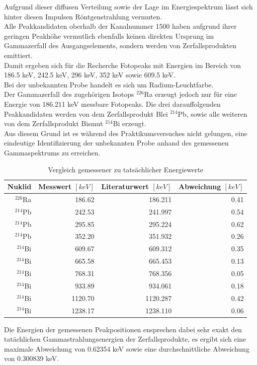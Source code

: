 \documentclass[12pt,german]{article}
\begin{document}
    Aufgrund dieser diffusen Verteilung sowie der Lage im Energiespektrum lässt sich hinter diesen Impulsen Röntgenstrahlung vermuten. \\
    Alle Peakkandidaten oberhalb der Kanalnummer 1500 haben aufgrund ihrer geringen Peakhöhe vermutlich ebenfalls keinen direkten Ursprung im Gammazerfall des Ausgangselements, sondern werden von Zerfallsprodukten emittiert. \\
    Damit ergeben sich für die Recherche Fotopeaks mit Energien im Bereich von 186.5 keV, 242.5 keV, 296 keV, 352 keV sowie 609.5 keV. \\
    Bei der unbekannten Probe handelt es sich um Radium-Leuchtfarbe. \\
    Der Gammazerfall des zugehörigen Isotops \(^{226}\)Ra erzeugt jedoch nur für eine Energie von 186.211 keV messbare Fotopeaks. Die drei darauffolgenden Peakkandidaten werden von dem Zerfallsprodukt Blei \(^{214}\)Pb, sowie alle weiteren von dem Zerfallsprodukt Bismut \(^{214}\)Bi erzeugt. \\
    Aus diesem Grund ist es während des Praktikumsversuches nicht gelungen, eine eindeutige Identifizierung der unbekannten Probe anhand des gemessenen Gammaspektrums zu erreichen. 
    \begin{table}[H]
        \centering
        \begin{tabularx}{1.0\textwidth}{R|R|R|R}
            \toprule
            \textbf{Nuklid} &  \textbf{Messwert \([keV]\)} & \textbf{Literaturwert \([keV]\)} & \textbf{Abweichung \([keV]\)} \\
            \midrule
            \(^{226}\)Ra & 186.62 & 186.211 &   0.41 \\
            \(^{214}\)Pb & 242.53 & 241.997 &   0.54 \\
            \(^{214}\)Pb & 295.85 & 295.224 &   0.62 \\
            \(^{214}\)Pb & 352.20 & 351.932 &   0.26 \\
            \(^{214}\)Bi & 609.67 & 609.312 &   0.35 \\
            \(^{214}\)Bi & 665.58 & 665.453 &   0.13 \\
            \(^{214}\)Bi & 768.31 & 768.356 &   0.05 \\
            \(^{214}\)Bi & 933.89 & 934.061 &   0.18 \\
            \(^{214}\)Bi & 1120.70 & 1120.287 &   0.42 \\
            \(^{214}\)Bi & 1238.17 & 1238.110 &   0.06 \\
            \bottomrule
        \end{tabularx}
        \caption{Vergleich gemessener zu tatsächlicher Energiewerte}
    \end{table}
    Die Energien der gemessenen Peakpositionen ensprechen dabei sehr exakt den tatächlichen Gammastrahlungsenergien der Zerfallsprodukte, es ergibt sich eine maximale Abweichung von 0.62354 keV sowie eine durchschnittliche Abweichung von 0.300839 keV.
\end{document}
